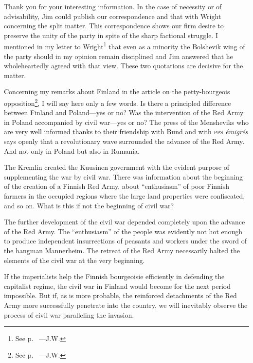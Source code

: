 

Thank you for your interesting information. In the case of necessity or of advisability, Jim could publish our correspondence and that with Wright concerning the split matter. This correspondence shows our firm desire to preserve the unity of the party in spite of the sharp factional struggle. I mentioned in my letter to Wright\footnote{See p.~\pageref{1939-12-18_a-letter-to-john-g-wright} ---J.W.} that even as a minority the Bolshevik wing of the party should in my opinion remain disciplined and Jim answered that he wholeheartedly agreed with that view. These two quotations are decisive for the matter.

Concerning my remarks about Finland in the article on the petty-bourgeois opposition\footnote{See p.~\pageref{1939-12-15_a-petty-bourgeois-opposition-in-the-socialist-workers-party} ---J.W.}, I will say here only a few words. Is there a principled difference between Finland and Poland---yes or no? Was the intervention of the Red Army in Poland accompanied by civil war---yes or no? The press of the Mensheviks who are very well informed thanks to their friendship with Bund and with \textsc{pps} \emph{émigrés} says openly that a revolutionary wave surrounded the advance of the Red Army. And not only in Poland but also in Rumania.

The Kremlin created the Kuusinen government with the evident purpose of supplementing the war by civil war. There was information about the beginning of the creation of a Finnish Red Army, about “enthusiasm” of poor Finnish farmers in the occupied regions where the large land properties were confiscated, and so on. What is this if not the beginning of civil war?

The further development of the civil war depended completely upon the advance of the Red Army. The “enthusiasm” of the people was evidently not hot enough to produce independent insurrections of peasants and workers under the sword of the hangman Mannerheim. The retreat of the Red Army necessarily halted the elements of the civil war at the very beginning.

If the imperialists help the Finnish bourgeoisie efficiently in defending the capitalist regime, the civil war in Finland would become for the next period impossible. But if, as is more probable, the reinforced detachments of the Red Army more successfully penetrate into the country, we will inevitably observe the process of civil war paralleling the invasion.

